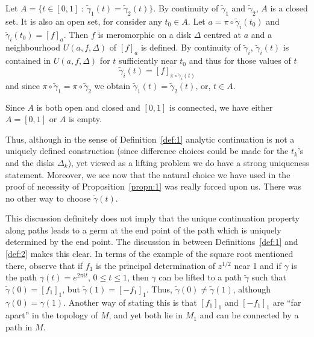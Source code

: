 \documentclass[a4paper,11pt]{article}
\begin{document}
\begin{myproof}
  Let $A = \{t\in [0,1] ~:~ \widetilde{\gamma}_1(t) =
  \widetilde{\gamma}_2(t) \}$.  By continuity of
  $\widetilde{\gamma}_1$ and $\widetilde{\gamma}_2$, $A$ is a closed
  set.  It is also an open set, for consider any $t_0 \in A$.  Let $a
  = \pi \circ \widetilde{\gamma}_i(t_0)$ and
  $\widetilde{\gamma}_i(t_0) = [f]_a$.  Then $f$ is meromorphic on a
  disk $\Delta$ centred at $a$ and a neighbourhood $U(a,f,\Delta)$ of
  $[f]_a$ is defined.  By continuity of $\widetilde{\gamma}_i$,
  $\widetilde{\gamma}_i(t)$ is contained in $U(a,f,\Delta)$ for $t$
  sufficiently near $t_0$ and thus for those values of $t$
  $$
  \widetilde{\gamma}_i(t) = [f]_{\pi \circ \widetilde{\gamma}_i(t)}
  $$
  and since $\pi \circ \widetilde{\gamma}_1 = \pi \circ
  \widetilde{\gamma}_2$ we obtain $\widetilde{\gamma}_1(t) =
  \widetilde{\gamma}_2(t)$, or, $t \in A$.

  Since $A$ is both open and closed and $[0,1]$ is connected, we have
  either $A = [0,1]$ or $A$ is empty.
\end{myproof}

Thus, although in the sense of Definition~\ref{def:1} analytic
continuation is not a uniquely defined construction (since difference 
choices could be made for the $t_k$'s and the disks $\Delta_k$), yet 
viewed as a lifting problem we do have a strong uniqueness statement.  
Moreover, we see now that the natural choice we have used in the proof 
of necessity of Proposition~\ref{propn:1} was really forced upon us.
There was no other way to choose $\widetilde{\gamma}(t)$.

This discussion definitely does not imply that the unique continuation
property along paths leads to a germ at the end point of the path
which is uniquely determined by the end point.  The discussion in
between Definitions~\ref{def:1} and \ref{def:2} makes this clear.  
In terms of the example of the square root mentioned there, observe 
that if $f_1$ is the
principal determination of $z^{1/2}$ near 1 and if $\gamma$ is the
path $\gamma(t) = e^{2\pi it}$, $0 \le t \le 1$, then $\gamma$ can be
lifted to a path $\widetilde{\gamma}$ such that $\widetilde{\gamma}(0)
= [f_1]_1$, but $\widetilde{\gamma}(1) = [-f_1]_1$.  Thus,
$\widetilde{\gamma}(0) \ne \widetilde{\gamma}(1)$, although
$\gamma(0) = \gamma(1)$.  Another way of stating this is that 
$[f_1]_1$ and $[-f_1]_1$ are ``far apart'' in the
topology of $M$, and yet both lie in $M_1$ and can be connected by a
path in $M$.
\end{document}
